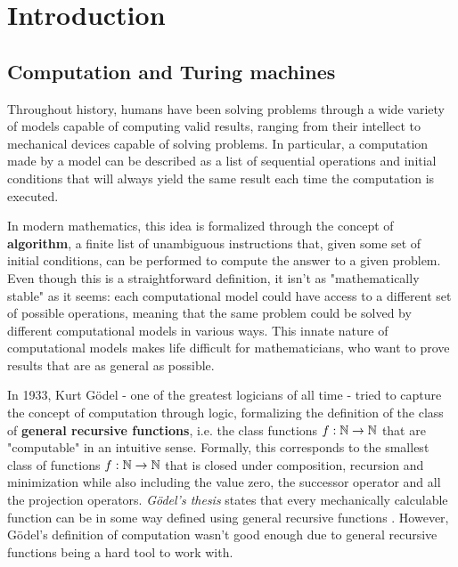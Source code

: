 
\chapter{Introduction} \label{chap:introduction}

\section{Computation and Turing machines}

Throughout history, humans have been solving problems through a wide variety of models capable of computing valid results, ranging from their intellect to mechanical devices capable of solving problems. In particular, a computation made by a model can be described as a list of sequential operations and initial conditions that will always yield the same result each time the computation is executed.

In modern mathematics, this idea is formalized through the concept of \textbf{algorithm}, a finite list of unambiguous instructions that, given some set of initial conditions, can be performed to compute the answer to a given problem. Even though this is a straightforward definition, it isn't as "mathematically stable" as it seems: each computational model could have access to a different set of possible operations, meaning that the same problem could be solved by different computational models in various ways. This innate nature of computational models makes life difficult for mathematicians, who want to prove results that are as general as possible. 

In 1933, Kurt Gödel - one of the greatest logicians of all time - tried to capture the concept of computation through logic, formalizing the definition of the class of \textbf{general recursive functions}, i.e. the class functions $f : \mathbb{N} \to \mathbb{N}$ that are "computable" in an intuitive sense. Formally, this corresponds to the smallest class of functions $f : \mathbb{N} \to \mathbb{N}$ that is closed under composition, recursion and minimization while also including the value zero, the successor operator and all the projection operators. \textit{Gödel's thesis} states that every mechanically calculable function can be in some way defined using general recursive functions \cite{godel}. However, Gödel's definition of computation wasn't good enough due to general recursive functions being a hard tool to work with.


